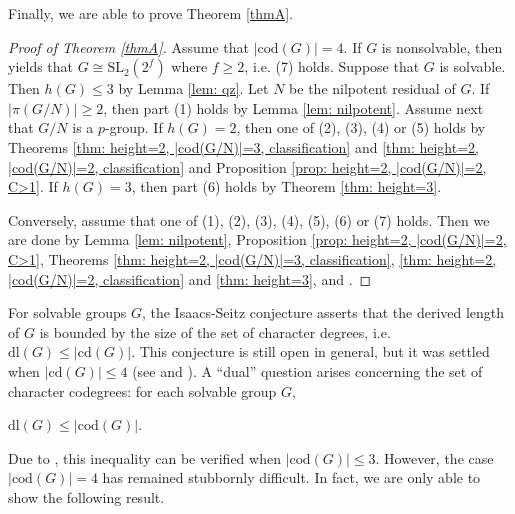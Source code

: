 \documentclass[9pt]{article}
\begin{document}
Finally, we are able to prove Theorem \ref{thmA}.






\begin{proof}[Proof of Theorem \ref{thmA}]
	Assume that $|\mathrm{cod}(G)|=4$.
	If $G$ is nonsolvable, then \cite[Theorem]{liu2021} yields that $G\cong \mathrm{SL}_2(2^{f})$ where $f\geq 2$, i.e. (7) holds.
	Suppose that $G$ is solvable.
	Then $h(G)\leq 3$ by Lemma \ref{lem: qz}.
	Let $N$ be the nilpotent residual of $G$.
   If $|\pi(G/N)|\geq 2$, then part (1) holds by Lemma \ref{lem: nilpotent}.
	Assume next that $G/N$ is a $p$-group.
	If $h(G)=2$, then one of (2), (3), (4) or (5) holds by Theorems \ref{thm: height=2, |cod(G/N)|=3, classification} and \ref{thm: height=2, |cod(G/N)|=2, classification} and Proposition \ref{prop: height=2, |cod(G/N)|=2, C>1}.
	If $h(G)=3$, then part (6) holds by Theorem \ref{thm: height=3}. 
	
	Conversely, assume that one of (1), (2), (3), (4), (5), (6) or (7) holds. 
	Then we are done by Lemma \ref{lem: nilpotent}, Proposition \ref{prop: height=2, |cod(G/N)|=2, C>1},
	Theorems \ref{thm: height=2, |cod(G/N)|=3, classification}, \ref{thm: height=2, |cod(G/N)|=2, classification} and \ref{thm: height=3}, and \cite[Theorem]{liu2021}.
\end{proof}





For solvable groups $G$, the Isaacs-Seitz conjecture asserts that the derived length of $G$ is bounded by
the size of the set of character degrees, i.e.
$\mathrm{dl}(G)\leq |\mathrm{cd}(G)|$. 
This conjecture is still open in general, but it was settled
when $|\mathrm{cd}(G)|\leq 4$ (see \cite[Theorem 12.15]{isaacs1994} and \cite{garrison}).
A ``dual'' question arises concerning the set of character codegrees: for each solvable group $G$,
\begin{center}
	$\mathrm{dl}(G)\leq |\mathrm{cod}(G)|$.
\end{center}
Due to \cite{alizadeh2019,du2016}, this inequality can be verified when $|\mathrm{cod}(G)|\leq 3$.
However, the case $|\mathrm{cod}(G)|=4$ has remained stubbornly difficult.
In fact, we are only able to show the following result.
\end{document}
